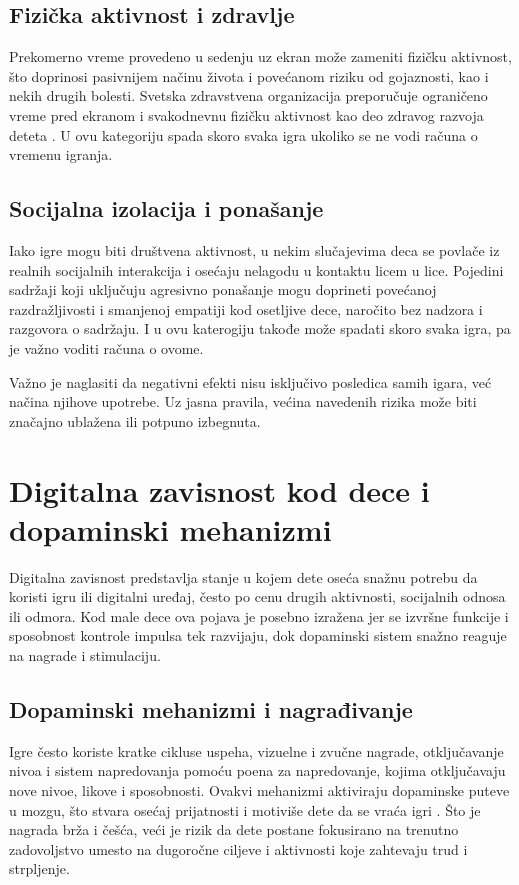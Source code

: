\documentclass[a4paper,12pt]{article}
\begin{document}
\subsection*{Fizička aktivnost i zdravlje}
Prekomerno vreme provedeno u sedenju uz ekran može zameniti fizičku aktivnost, što doprinosi pasivnijem načinu života i povećanom riziku od gojaznosti, kao i nekih drugih bolesti. 
Svetska zdravstvena organizacija preporučuje ograničeno vreme pred ekranom i svakodnevnu fizičku aktivnost kao deo zdravog razvoja deteta \cite{who_guidelines_2020}. U ovu kategoriju spada skoro svaka igra ukoliko se ne vodi računa o vremenu igranja.

\subsection*{Socijalna izolacija i ponašanje}
Iako igre mogu biti društvena aktivnost, u nekim slučajevima deca se povlače iz realnih socijalnih interakcija i osećaju nelagodu u kontaktu licem u lice. 
Pojedini sadržaji koji uključuju agresivno ponašanje mogu doprineti povećanoj razdražljivosti i smanjenoj empatiji kod osetljive dece, naročito bez nadzora i razgovora o sadržaju. I u ovu katerogiju takođe može spadati skoro svaka igra, pa je važno voditi računa o ovome.

\bigskip

Važno je naglasiti da negativni efekti nisu isključivo posledica samih igara, već načina njihove upotrebe. 
Uz jasna pravila, većina navedenih rizika može biti značajno ublažena ili potpuno izbegnuta.


\section{Digitalna zavisnost kod dece i dopaminski mehanizmi}

Digitalna zavisnost predstavlja stanje u kojem dete oseća snažnu potrebu da koristi igru ili digitalni uređaj, često po cenu drugih aktivnosti, socijalnih odnosa ili odmora. Kod male dece ova pojava je posebno izražena jer se izvršne funkcije i sposobnost kontrole impulsa tek razvijaju, dok dopaminski sistem snažno reaguje na nagrade i stimulaciju.

\subsection*{Dopaminski mehanizmi i nagrađivanje}
Igre često koriste kratke cikluse uspeha, vizuelne i zvučne nagrade, otključavanje nivoa i sistem napredovanja pomoću poena za napredovanje, kojima otključavaju nove nivoe, likove i sposobnosti. Ovakvi mehanizmi aktiviraju dopaminske puteve u mozgu, što stvara osećaj prijatnosti i motiviše dete da se vraća igri \cite{pontes2020insights}.  
Što je nagrada brža i češća, veći je rizik da dete postane fokusirano na trenutno zadovoljstvo umesto na dugoročne ciljeve i aktivnosti koje zahtevaju trud i strpljenje.
\end{document}
